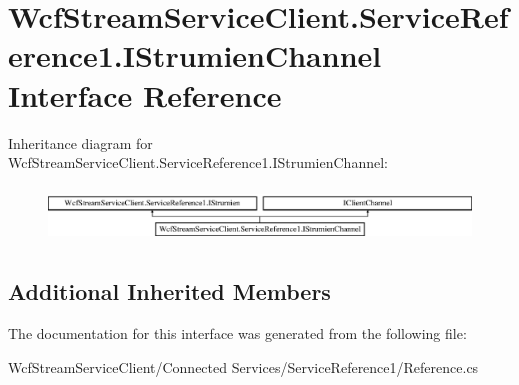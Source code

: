 \hypertarget{interface_wcf_stream_service_client_1_1_service_reference1_1_1_i_strumien_channel}{}\section{Wcf\+Stream\+Service\+Client.\+Service\+Reference1.\+I\+Strumien\+Channel Interface Reference}
\label{interface_wcf_stream_service_client_1_1_service_reference1_1_1_i_strumien_channel}
Inheritance diagram for Wcf\+Stream\+Service\+Client.\+Service\+Reference1.\+I\+Strumien\+Channel\+:\begin{figure}[H]
\begin{center}
\leavevmode
\includegraphics[height=1.497326cm]{interface_wcf_stream_service_client_1_1_service_reference1_1_1_i_strumien_channel}
\end{center}
\end{figure}
\subsection*{Additional Inherited Members}


The documentation for this interface was generated from the following file\+:\begin{DoxyCompactItemize}
\item 
Wcf\+Stream\+Service\+Client/\+Connected Services/\+Service\+Reference1/Reference.\+cs\end{DoxyCompactItemize}
